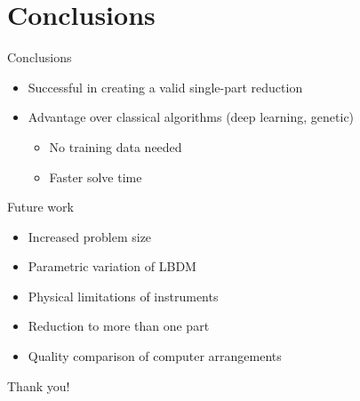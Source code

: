 \documentclass[handout]{beamer}
\begin{document}
\section{Conclusions}

\begin{frame}{Conclusions}
    \begin{itemize}
        \item Successful in creating a valid single-part reduction
        \item Advantage over classical algorithms (deep learning, genetic)
        \begin{itemize}
            \item No training data needed
            \item Faster solve time
        \end{itemize}
    \end{itemize}
\end{frame}
\note[itemize]{
    \item{}
}

\begin{frame}{Future work}
    \begin{itemize}
        \item Increased problem size
        \item Parametric variation of LBDM
        \item Physical limitations of instruments
        \item Reduction to more than one part
        \item Quality comparison of computer arrangements
    \end{itemize}
\end{frame}
\note[itemize]{
    \item{}
}

\begin{frame}[standout]
    Thank you!
\end{frame}

\appendix

\begin{frame}
    \titlepage
\end{frame}
\end{document}
